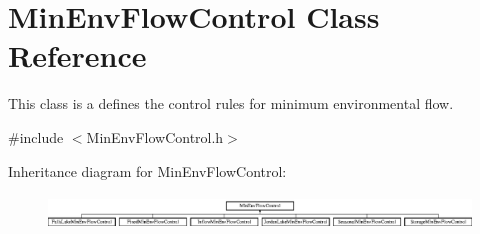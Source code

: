 \hypertarget{classMinEnvFlowControl}{}\section{Min\+Env\+Flow\+Control Class Reference}
\label{classMinEnvFlowControl}


This class is a defines the control rules for minimum environmental flow.  




{\ttfamily \#include $<$Min\+Env\+Flow\+Control.\+h$>$}

Inheritance diagram for Min\+Env\+Flow\+Control\+:\begin{figure}[H]
\begin{center}
\leavevmode
\includegraphics[height=0.942761cm]{classMinEnvFlowControl}
\end{center}
\end{figure}
